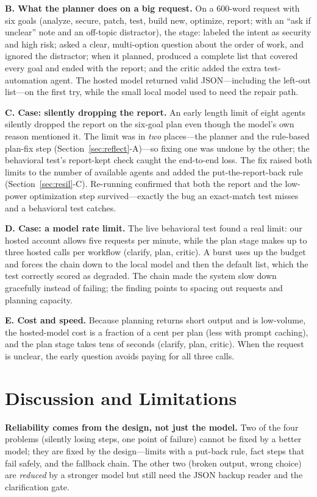 \documentclass[conference]{IEEEtran}
\begin{document}
\textbf{B. What the planner does on a big request.} On a 600-word request with six
goals (analyze, secure, patch, test, build new, optimize, report; with an ``ask if
unclear'' note and an off-topic distractor), the stage: labeled the intent as
security and high risk; asked a clear, multi-option question about the order of
work, and ignored the distractor; when it planned, produced a complete list that
covered every goal and ended with the report; and the critic added the extra
test-automation agent. The hosted model returned valid JSON---including the
left-out list---on the first try, while the small local model used to need the
repair path.

\textbf{C. Case: silently dropping the report.} An early length limit of eight
agents silently dropped the report on the six-goal plan even though the model's own
reason mentioned it. The limit was in \emph{two} places---the planner and the
rule-based plan-fix step (Section~\ref{sec:reflect}-A)---so fixing one was undone by the
other; the behavioral test's report-kept check caught the end-to-end loss. The fix
raised both limits to the number of available agents and added the
put-the-report-back rule (Section~\ref{sec:resil}-C). Re-running confirmed that both the
report and the low-power optimization step survived---exactly the bug an exact-match
test misses and a behavioral test catches.

\textbf{D. Case: a model rate limit.} The live behavioral test found a real limit:
our hosted account allows five requests per minute, while the plan stage makes up to
three hosted calls per workflow (clarify, plan, critic). A burst uses up the budget
and forces the chain down to the local model and then the default list, which the
test correctly scored as degraded. The chain made the system slow down gracefully
instead of failing; the finding points to spacing out requests and planning
capacity.

\textbf{E. Cost and speed.} Because planning returns short output and is low-volume,
the hosted-model cost is a fraction of a cent per plan (less with prompt caching),
and the plan stage takes tens of seconds (clarify, plan, critic). When the request
is unclear, the early question avoids paying for all three calls.

\section{Discussion and Limitations}
\textbf{Reliability comes from the design, not just the model.} Two of the four
problems (silently losing steps, one point of failure) cannot be fixed by a better
model; they are fixed by the design---limits with a put-back rule, fact steps that
fail safely, and the fallback chain. The other two (broken output, wrong choice) are
\emph{reduced} by a stronger model but still need the JSON backup reader and the
clarification gate.
\end{document}
